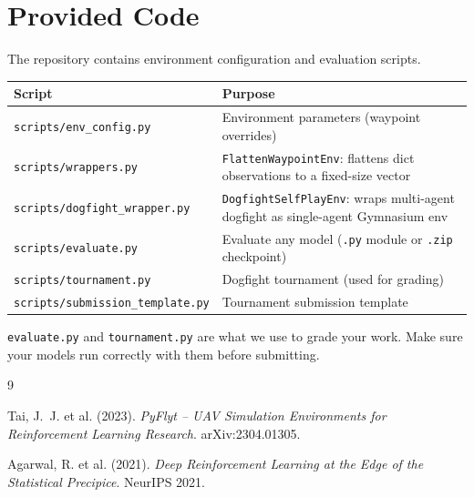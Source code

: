 \documentclass[11pt,a4paper]{article}
\begin{document}
\section{Provided Code}
\label{sec:starter}

The repository contains environment configuration and evaluation scripts.

\begin{table}[H]
\centering
\begin{tabularx}{\textwidth}{lX}
\toprule
\textbf{Script} & \textbf{Purpose} \\
\midrule
\texttt{scripts/env\_config.py} & Environment parameters (waypoint overrides) \\
\texttt{scripts/wrappers.py} & \texttt{FlattenWaypointEnv}: flattens dict observations to a fixed-size vector \\
\texttt{scripts/dogfight\_wrapper.py} & \texttt{DogfightSelfPlayEnv}: wraps multi-agent dogfight as single-agent Gymnasium env \\
\texttt{scripts/evaluate.py} & Evaluate any model (\texttt{.py} module or \texttt{.zip} checkpoint) \\
\texttt{scripts/tournament.py} & Dogfight tournament (used for grading) \\
\texttt{scripts/submission\_template.py} & Tournament submission template \\
\bottomrule
\end{tabularx}
\end{table}

\texttt{evaluate.py} and \texttt{tournament.py} are what we use to grade your work. Make sure your models run correctly with them before submitting.

\newpage

\begin{thebibliography}{9}

Tai, J.~J. et al. (2023).
\textit{PyFlyt -- UAV Simulation Environments for Reinforcement Learning Research}.
arXiv:2304.01305.

Agarwal, R. et al. (2021).
\textit{Deep Reinforcement Learning at the Edge of the Statistical Precipice}.
NeurIPS 2021.

\end{thebibliography}
\end{document}
